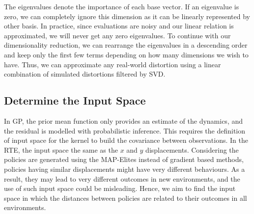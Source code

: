 \documentclass[journal]{IEEEtran}
\begin{document}
The eigenvalues denote the importance of each base vector.
If an eigenvalue is zero, we can completely ignore this dimension as it can be linearly represented by other basis.
In practice, since evaluations are noisy and our linear relation is approximated, we will never get any zero eigenvalues. 
To continue with our dimensionality reduction, we can rearrange the eigenvalues in a descending order and keep only the first few terms depending on how many dimensions we wish to have.
Thus, we can approximate any real-world distortion using a linear combination of simulated distortions filtered by SVD.



\subsection{Determine the Input Space}
In GP, the prior mean function only provides an estimate of the dynamics, and the residual is modelled with probabilistic inference.
This requires the definition of input space for the kernel to build the covariance between observations.
In the RTE, the input space the same as the $x$ and $y$ displacements.
Considering the policies are generated using the MAP-Elites instead of gradient based methods, policies having similar displacements might have very different behaviours.
As a result, they may lead to very different outcomes in new environments, and the use of such input space could be misleading.
Hence, we aim to find the input space in which the distances between policies are related to their outcomes in all environments. 
\end{document}
